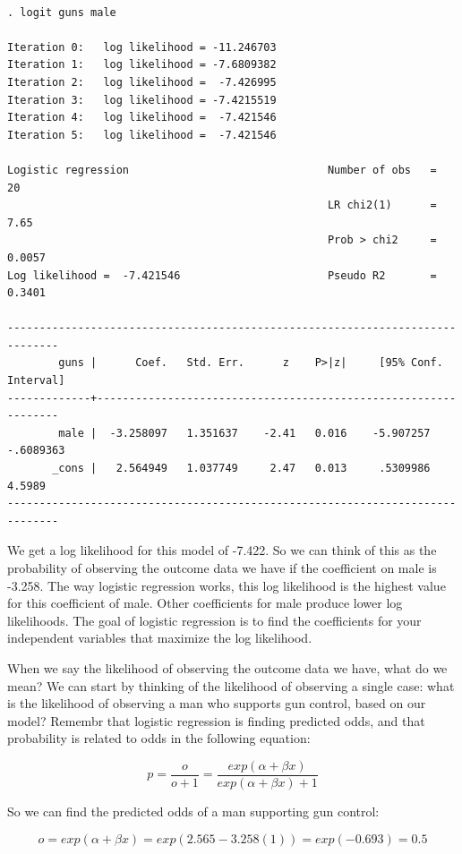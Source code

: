 \documentclass[12pt]{amsart}
\begin{document}
\begin{verbatim}

. logit guns male

Iteration 0:   log likelihood = -11.246703  
Iteration 1:   log likelihood = -7.6809382  
Iteration 2:   log likelihood =  -7.426995  
Iteration 3:   log likelihood = -7.4215519  
Iteration 4:   log likelihood =  -7.421546  
Iteration 5:   log likelihood =  -7.421546  

Logistic regression                               Number of obs   =         20
                                                  LR chi2(1)      =       7.65
                                                  Prob > chi2     =     0.0057
Log likelihood =  -7.421546                       Pseudo R2       =     0.3401

------------------------------------------------------------------------------
        guns |      Coef.   Std. Err.      z    P>|z|     [95% Conf. Interval]
-------------+----------------------------------------------------------------
        male |  -3.258097   1.351637    -2.41   0.016    -5.907257   -.6089363
       _cons |   2.564949   1.037749     2.47   0.013     .5309986      4.5989
------------------------------------------------------------------------------
\end{verbatim}

We get a log likelihood for this model of -7.422. So we can think of this as the probability of observing the outcome data we have if the coefficient on male is -3.258. The way logistic regression works, this log likelihood is the highest value for this coefficient of male. Other coefficients for male produce lower log likelihoods. The goal of logistic regression is to find the coefficients for your independent variables that maximize the log likelihood.

When we say the likelihood of observing the outcome data we have, what do we mean? We can start by thinking of the likelihood of observing a single case: what is the likelihood of observing a man who supports gun control, based on our model? Remembr that logistic regression is finding predicted odds, and that probability is related to odds in the following equation:

\[ p = \frac{o}{o+1} = \frac{exp(\alpha + \beta x)}{exp(\alpha + \beta x)+1} \]

So we can find the predicted odds of a man supporting gun control:

\[ o = exp(\alpha + \beta x) = exp(2.565 - 3.258 (1)) = exp(-0.693) = 0.5 \]
\end{document}
